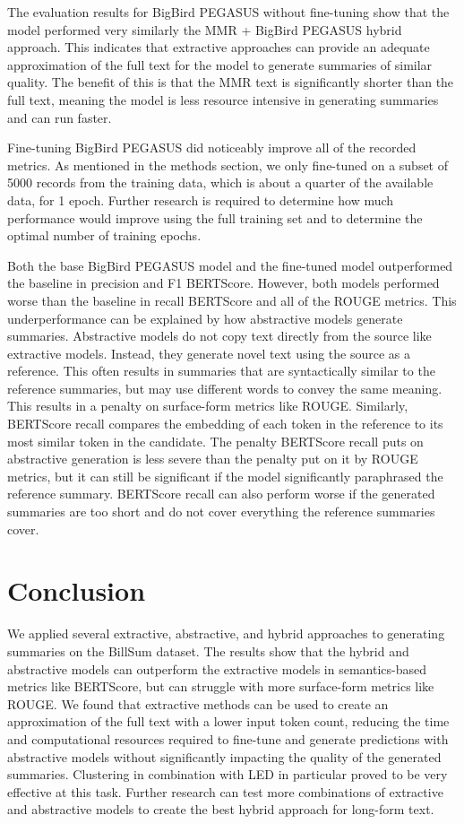 \documentclass[11pt]{article}
\begin{document}
The evaluation results for BigBird PEGASUS without fine-tuning show that the model performed very similarly the MMR + BigBird PEGASUS hybrid approach. This indicates that extractive approaches can provide an adequate approximation of the full text for the model to generate summaries of similar quality. The benefit of this is that the MMR text is significantly shorter than the full text, meaning the model is less resource intensive in generating summaries and can run faster.

Fine-tuning BigBird PEGASUS did noticeably improve all of the recorded metrics. As mentioned in the methods section, we only fine-tuned on a subset of 5000 records from the training data, which is about a quarter of the available data, for 1 epoch. Further research is required to determine how much performance would improve using the full training set and to determine the optimal number of training epochs. 

Both the base BigBird PEGASUS model and the fine-tuned model outperformed the baseline in precision and F1 BERTScore. However, both models performed worse than the baseline in recall BERTScore and all of the ROUGE metrics. This underperformance can be explained by how abstractive models generate summaries. Abstractive models do not copy text directly from the source like extractive models. Instead, they generate novel text using the source as a reference. This often results in summaries that are syntactically similar to the reference summaries, but may use different words to convey the same meaning. This results in a penalty on surface-form metrics like ROUGE. Similarly, BERTScore recall compares the embedding of each token in the reference to its most similar token in the candidate. The penalty BERTScore recall puts on abstractive generation is less severe than the penalty put on it by ROUGE metrics, but it can still be significant if the model significantly paraphrased the reference summary. BERTScore recall can also perform worse if the generated summaries are too short and do not cover everything the reference summaries cover.

\section{Conclusion}

We applied several extractive, abstractive, and hybrid approaches to generating summaries on the BillSum dataset. The results show that the hybrid and abstractive models can outperform the extractive models in semantics-based metrics like BERTScore, but can struggle with more surface-form metrics like ROUGE. We found that extractive methods can be used to create an approximation of the full text with a lower input token count, reducing the time and computational resources required to fine-tune and generate predictions with abstractive models without significantly impacting the quality of the generated summaries. Clustering in combination with LED in particular proved to be very effective at this task. Further research can test more combinations of extractive and abstractive models to create the best hybrid approach for long-form text. 
\end{document}
